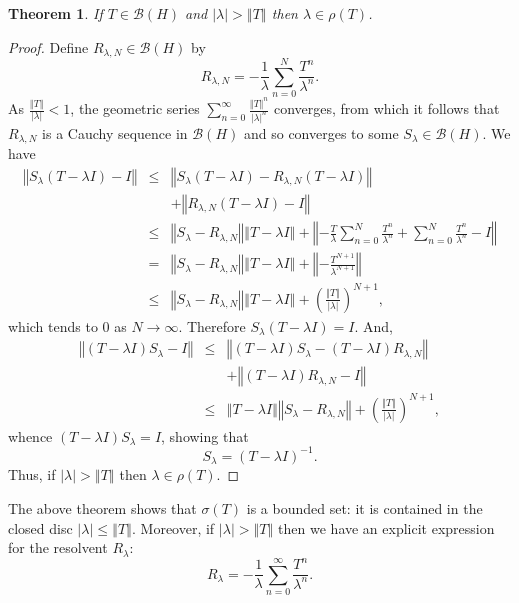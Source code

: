 \documentclass{article}
\newcommand{\norm}[1]{\left\Vert #1 \right\Vert}
\newtheorem{theorem}{Theorem}
\begin{document}
\begin{theorem}
If $T \in \mathscr{B}(H)$ and 
 $|\lambda|>\norm{T}$ then $\lambda \in \rho(T)$.
\end{theorem}
\begin{proof}
Define $R_{\lambda,N} \in \mathscr{B}(H)$ by
\[
R_{\lambda,N}=-\frac{1}{\lambda} \sum_{n=0}^N \frac{T^n}{\lambda^n}.
\]
As $\frac{\norm{T}}{|\lambda|} < 1$, the geometric series $\sum_{n=0}^\infty \frac{\norm{T}^n}{|\lambda|^n}$ converges, from which it follows that
$R_{\lambda,N}$ is a Cauchy sequence in $\mathscr{B}(H)$ and so converges to some $S_\lambda \in \mathscr{B}(H)$.
We have
\begin{eqnarray*}
\norm{S_\lambda(T-\lambda I) - I}&\leq&\norm{S_\lambda(T-\lambda I) - R_{\lambda,N}(T-\lambda I)}\\
&&+\norm{R_{\lambda,N}(T-\lambda I)-I}\\
&\leq&\norm{S_\lambda - R_{\lambda,N}} \norm{T-\lambda I} + \norm{-\frac{T}{\lambda} \sum_{n=0}^N \frac{T^n}{\lambda^n}
+\sum_{n=0}^N \frac{T^n}{\lambda^n} -I}\\
&=&\norm{S_\lambda - R_{\lambda,N}} \norm{T-\lambda I} + \norm{-\frac{T^{N+1}}{\lambda^{N+1}}}\\
&\leq&\norm{S_\lambda - R_{\lambda,N}} \norm{T-\lambda I} + \left( \frac{\norm{T}}{|\lambda|} \right)^{N+1},
\end{eqnarray*}
which tends to $0$ as $N \to \infty$. Therefore
$S_\lambda(T-\lambda I) = I$. And,
\begin{eqnarray*}
\norm{(T-\lambda I) S_\lambda-I}&\leq&\norm{(T-\lambda I) S_\lambda - (T-\lambda I) R_{\lambda,N}}\\
&&+\norm{(T-\lambda I) R_{\lambda,N} - I}\\
&\leq&\norm{T-\lambda I} \norm{S_\lambda -R_{\lambda,N}} + \left(\frac{\norm{T}}{|\lambda|} \right)^{N+1},
\end{eqnarray*}
whence $(T-\lambda I) S_\lambda = I$, showing that
\[
S_\lambda = (T-\lambda I)^{-1}.
\]
Thus, if $|\lambda| > \norm{T}$ then $\lambda  \in \rho(T)$.
\end{proof}


 The above theorem shows that $\sigma(T)$ is a bounded set: it is contained in the closed disc
$|\lambda| \leq \norm{T}$. Moreover, if $|\lambda| > \norm{T}$ then we have an explicit expression for the resolvent
$R_\lambda$:
\[
R_\lambda = - \frac{1}{\lambda} \sum_{n=0}^\infty \frac{T^n}{\lambda^n}.
\]
\end{document}
